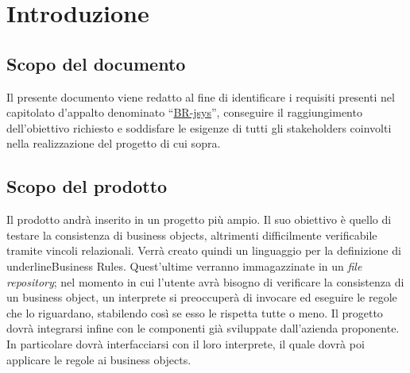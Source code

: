 \tableofcontents

\chapter{Introduzione}
\section{Scopo del documento}
Il presente documento viene redatto al fine di identificare i requisiti presenti nel capitolato d'appalto denominato ``\underline{BR-jsys}'', conseguire il raggiungimento dell'obiettivo richiesto e soddisfare le esigenze di tutti gli stakeholders coinvolti nella realizzazione del progetto di cui sopra.
\section{Scopo del prodotto}
Il prodotto andr\`a inserito in un progetto pi\`u ampio. Il suo obiettivo \`e quello di testare la consistenza di business objects, altrimenti difficilmente verificabile tramite vincoli relazionali.
Verr\`a creato quindi un linguaggio per la definizione di \\underline{Business Rules}. Quest'ultime verranno immagazzinate in un \textit{file repository}; nel momento in cui l'utente avr\`a bisogno di verificare la consistenza di un business object, un interprete si preoccuper\`a di invocare ed eseguire le regole che lo riguardano, stabilendo cos\`i se esso le rispetta tutte o meno.
Il progetto dovr\`a integrarsi infine con le componenti gi\`a sviluppate dall'azienda proponente. In particolare dovr\`a interfacciarsi con il loro interprete, il quale dovr\`a poi applicare le regole ai business objects.
